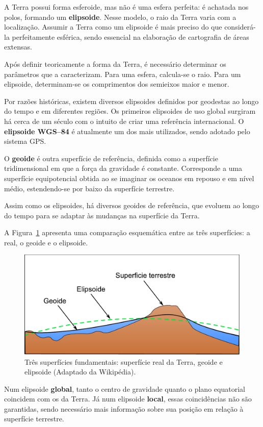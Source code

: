 A Terra possui forma esferoide, mas não é uma esfera perfeita: é achatada nos polos, formando um \textbf{elipsoide}. Nesse modelo, o raio da Terra varia com a localização. Assumir a Terra como um elipsoide é mais preciso do que considerá-la perfeitamente esférica, sendo essencial na elaboração de cartografia de áreas extensas.

Após definir teoricamente a forma da Terra, é necessário determinar os parâmetros que a caracterizam. Para uma esfera, calcula-se o raio. Para um elipsoide, determinam-se os comprimentos dos semieixos maior e menor.

Por razões históricas, existem diversos elipsoides definidos por geodestas ao longo do tempo e em diferentes regiões. Os primeiros elipsoides de uso global surgiram há cerca de um século com o intuito de criar uma referência internacional. O \textbf{elipsoide WGS--84} é atualmente um dos mais utilizados, sendo adotado pelo sistema GPS.

O \textbf{geoide} é outra superfície de referência, definida como a superfície tridimensional em que a força da gravidade é constante. Corresponde a uma superfície equipotencial obtida ao se imaginar os oceanos em repouso e em nível médio, estendendo-se por baixo da superfície terrestre.

Assim como os elipsoides, há diversos geoides de referência, que evoluem ao longo do tempo para se adaptar às mudanças na superfície da Terra.

A Figura~\ref{Fig:Tres_superficies} apresenta uma comparação esquemática entre as três superfícies: a real, o geoide e o elipsoide.

\begin{figure}
\centering
\includegraphics[width=.7\columnwidth]{Fundamentos_cartograficos/Tres_superficies.pdf}
\caption{\small Três superfícies fundamentais: superfície real da Terra, geoide e elipsoide (Adaptado da Wikipédia).}
\label{Fig:Tres_superficies} 
\end{figure}

Num elipsoide \textbf{global}, tanto o centro de gravidade quanto o plano equatorial coincidem com os da Terra. Já num elipsoide \textbf{local}, essas coincidências não são garantidas, sendo necessário mais informação sobre sua posição em relação à superfície terrestre.

